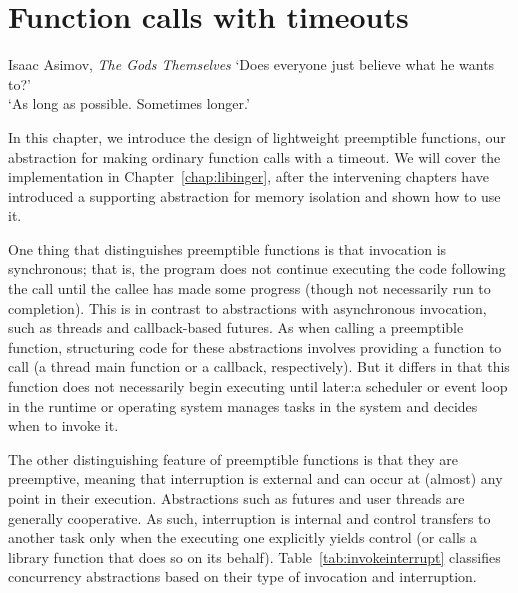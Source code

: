 \chapter{Function calls with timeouts}
\label{chap:functions}

\ifdefined\chapquotes
\begin{chapquote}{Isaac Asimov, \textit{The Gods Themselves}}
`Does everyone just believe what he wants to?' \\
`As long as possible.  Sometimes longer.'
\end{chapquote}
\fi

In this chapter, we introduce the design of lightweight preemptible functions, our
abstraction for making ordinary function calls with a timeout.  We will cover the
implementation in Chapter~\ref{chap:libinger}, after the intervening chapters have
introduced a supporting abstraction for memory isolation and shown how to use it.

One thing that distinguishes preemptible functions is that invocation is synchronous;
that is, the program does not continue executing the code following the call until
the callee has made some progress (though not necessarily run to completion).  This
is in contrast to abstractions with asynchronous invocation, such as threads and
callback-based futures.  As when calling a preemptible function, structuring code for
these abstractions involves providing a function to call (a thread main function or a
callback, respectively).  But it differs in that this function does not necessarily
begin executing until later:\@ a scheduler or event loop in the runtime or operating
system manages tasks in the system and decides when to invoke it.

The other distinguishing feature of preemptible functions is that they are
preemptive, meaning that interruption is external and can occur at (almost) any point
in their execution.  Abstractions such as futures and user threads are generally
cooperative.  As such, interruption is internal and control transfers to another task
only when the executing one explicitly yields control (or calls a library function
that does so on its behalf).  Table~\ref{tab:invokeinterrupt} classifies concurrency
abstractions based on their type of invocation and interruption.

